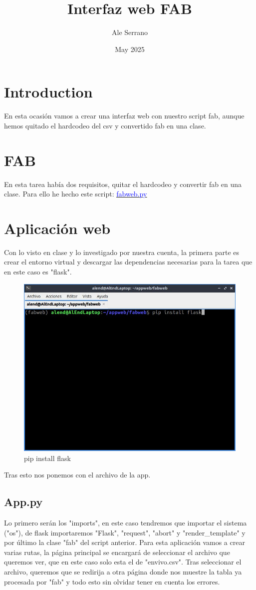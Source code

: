 \documentclass{article}
\title{Interfaz web FAB}
\author{Ale Serrano}
\date{May 2025}
\begin{document}
\maketitle

\section{Introduction}

En esta ocasión vamos a crear una interfaz web con nuestro script fab, aunque hemos quitado el hardcodeo del csv y convertido fab en una clase. 

\section{FAB}
En esta tarea había dos requisitos, quitar el hardcodeo y convertir fab en una clase. Para ello he hecho este script: \href{fabweb.py}{\underline{\textcolor{blue}{fabweb.py}}}


\section{Aplicación web}
Con lo visto en clase y lo investigado por nuestra cuenta, la primera parte es crear el entorno virtual y descargar las dependencias necesarias para la tarea que en este caso es "flask". 

\begin{figure}
    \centering
    \includegraphics[width=0.5\linewidth]{Images/fabweb1.jpg}
    \caption{pip install flask}
    \label{fig:enter-label}
\end{figure}

Tras esto nos ponemos con el archivo de la app.

\subsection{App.py}
Lo primero serán los "imports", en este caso tendremos que importar el sistema ("os"), de flask importaremos "Flask", "request", "abort" y "render\_template" y por último la clase "fab" del script anterior. Para esta aplicación vamos a crear varias rutas, la página principal se encargará de seleccionar el archivo que queremos ver, que en este caso solo esta el de "envivo.csv". Tras seleccionar el archivo, queremos que se redirija a otra página donde nos muestre la tabla ya procesada por "fab" y todo esto sin olvidar tener en cuenta los errores.\
\end{document}
